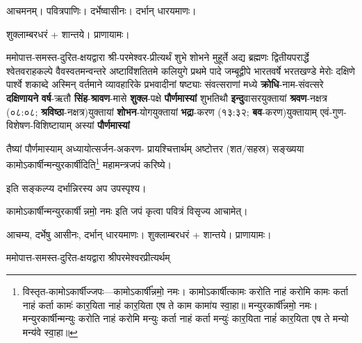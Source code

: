 
\setlength{\parindent}{0pt}

\newcommand{\sep}{\hspace{-0.5ex}{\small$\circ$}\hspace{0.5ex}}
\newcommand{\yutithyadi}{\textbf{क्रोधि}-नाम-संवत्सरे    \textbf{दक्षिणायने} \textbf{वर्ष}-ऋतौ   \textbf{सिंह}-\textbf{श्रावण}-मासे  \textbf{शुक्ल}-पक्षे    \textbf{पौर्णमास्यां} शुभतिथौ   \textbf{इन्दु}\-वासर\-युक्तायां \textbf{श्रवण}-नक्षत्र (०८:०८; \textbf{श्रविष्ठा}-नक्षत्र)\-युक्तायां   \textbf{शोभन}-योग\-युक्तायां    \textbf{भद्रा}-करण (१३:३२; \textbf{बव}-करण)\-युक्तायाम् एवं-गुण-विशेषण-विशिष्टायाम्     अस्यां \textbf{पौर्णमास्यां}}
\newcommand{\instruct}[2]{#1}
\begingroup


आचमनम्। पवित्रपाणिः। दर्भेष्वासीनः। दर्भान् धारयमाणः।

शुक्लाम्बरधरं + शान्तये। प्राणायामः।

ममोपात्त-समस्त-दुरित-क्षयद्वारा श्री-परमेश्वर-प्रीत्यर्थं शुभे शोभने मुहूर्ते अद्य ब्रह्मणः
द्वितीयपरार्द्धे श्वेतवराहकल्पे वैवस्वतमन्वन्तरे अष्टाविंशतितमे कलियुगे प्रथमे पादे
जम्बूद्वीपे भारतवर्षे भरतखण्डे मेरोः दक्षिणे पार्श्वे शकाब्दे अस्मिन् वर्तमाने व्यावहारिके
 प्रभवादीनां षष्ट्याः संवत्सराणां मध्ये
\yutithyadi

तैष्यां पौर्णमास्याम् अध्यायोत्सर्जन-अकरण- प्रायश्चित्तार्थम् अष्टोत्तर (शत/सहस्र) सङ्ख्यया कामोऽकार्षीन्मन्युरकार्षीदिति\footnote{विस्तृत-कामोऽकार्षीज्जपः---कामोऽकार्\mbox{}षी᳚न्नमो॒ नमः। 
 कामोऽकार्\mbox{}षीत्कामः करोति नाहं करोमि कामः कर्ता नाहं कर्ता कामः॑ कार॒यिता नाहं॑ कार॒यिता एष ते काम कामा॑य स्वा॒हा॥ मन्युरकार्\mbox{}षी᳚न्नमो॒ नमः। 
मन्युरकार्\mbox{}षीन्मन्युः करोति नाहं करोमि मन्युः कर्ता नाहं कर्ता मन्युः॑ कार॒यिता नाहं॑ कार॒यिता एष ते मन्यो मन्य॑वे स्वा॒हा॥} महा\-मन्त्र\-जपं करिष्ये।

\instruct{इति सङ्कल्प्य दर्भान्निरस्य अप उपस्पृश्य।}{என்று ஸங்கல்பம் செய்து கொண்டு தர்பைகளை கீழே போட்டுவிட்டு ஜலத்தை தொடவும்.}

\instruct{कामोऽकार्षीन्मन्युरकार्षीन्नमो॒  नमः  इति जपं कृत्वा पवित्रं विसृज्य आचामेत्।}{காமோகார்ஷீத் மன்யுரகார்ஷீன்னமோ நம: என்று ஜபித்து முடிவில் ப்ராணாயாமம் செய்து உபஸ்தானம் செய்யவும். பவித்ரத்தை விஸர்ஜனம் செய்து ஆசமனம் செய்யவும்.}


आचम्य, दर्भेषु आसीनः, दर्भान् धारयमाणः। शुक्लाम्बरधरं + शान्तये। प्राणायामः।

ममोपात्त-समस्त-दुरित-क्षयद्वारा श्रीपरमेश्वरप्रीत्यर्थम्

